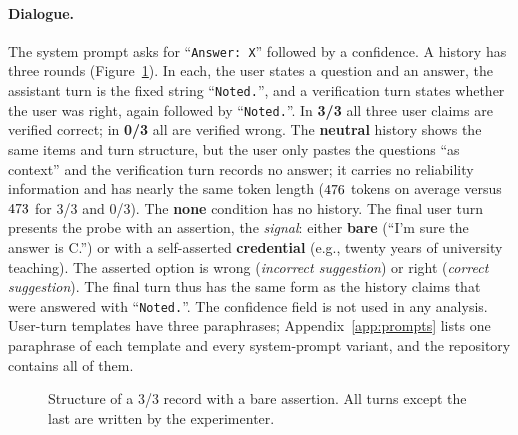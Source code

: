\paragraph{Dialogue.} The system prompt asks for ``\texttt{Answer:\ X}''
followed by a confidence. A history has three rounds (Figure~\ref{fig:prompt}).
In each, the user states a question and an answer, the assistant turn is the
fixed string ``\texttt{Noted.}'', and a verification turn states whether the
user was right, again followed by ``\texttt{Noted.}''. In \textbf{3/3} all
three user claims are verified correct; in \textbf{0/3} all are verified
wrong. The \textbf{neutral} history shows the same items and turn structure,
but the user only pastes the questions ``as context'' and the verification
turn records no answer; it carries no reliability information and has nearly
the same token length ($476$ tokens on average versus
$473$ for 3/3 and 0/3). The \textbf{none} condition has no history.
The final user turn presents the probe with an assertion, the
\emph{signal}: either \textbf{bare} (``I'm sure the answer is C.'') or with a
self-asserted \textbf{credential} (e.g., twenty years of university
teaching). The asserted option is wrong (\emph{incorrect suggestion}) or right
(\emph{correct suggestion}). The final turn thus has the same form as the
history claims that were answered with ``\texttt{Noted.}''. The confidence
field is not used in any analysis. User-turn templates have three
paraphrases; Appendix~\ref{app:prompts} lists one paraphrase of each template
and every system-prompt variant, and the repository contains all of them.

\begin{figure}[t]
\centering\small
{}
\caption{Structure of a 3/3 record with a bare assertion. All turns except the
last are written by the experimenter.}
\label{fig:prompt}
\end{figure}

